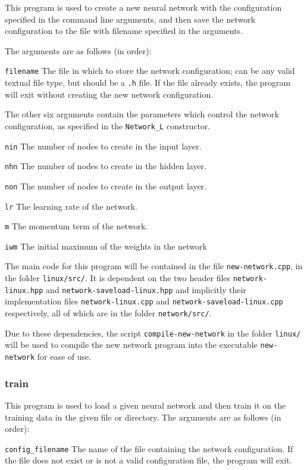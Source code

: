 \documentclass[a4paper]{article}
\begin{document}
This program is used to create a new neural network with the configuration specified in the command line arguments, and then save the network configuration to the file with filename specified in the arguments.

The arguments are as follows (in order):

\lstinline{filename} The file in which to store the network configuration; can be any valid textual file type, but should be a \lstinline{.h} file. If the file already exists, the program will exit without creating the new network configuration.

The other six arguments contain the parameters which control the network configuration, as specified in the \lstinline{Network_L} constructor.

\lstinline{nin} The number of nodes to create in the input layer.

\lstinline{nhn} The number of nodes to create in the hidden layer.

\lstinline{non} The number of nodes to create in the output layer.

\lstinline{lr} The learning rate of the network.

\lstinline{m} The momentum term of the network.

\lstinline{iwm} The initial maximum of the weights in the network

The main code for this program will be contained in the file \lstinline{new-network.cpp}, in the folder \lstinline{linux/src/}. It is dependent on the two header files \lstinline{network-linux.hpp} and \lstinline{network-saveload-linux.hpp} and implicitly their implementation files \lstinline{network-linux.cpp} and \lstinline{network-saveload-linux.cpp} respectively, all of which are in the folder \lstinline{network/src/}.

Due to these dependencies, the script \lstinline{compile-new-network} in the folder \lstinline{linux/} will be used to compile the new network program into the executable \lstinline{new-network} for ease of use.

\subsubsection{train}
\label{subsubsec:dc_csa_train}

This program is used to load a given neural network and then train it on the training data in the given file or directory. The arguments are as follows (in order):

\lstinline{config_filename} The name of the file containing the network configuration. If the file does not exist or is not a valid configuration file, the program will exit.
\end{document}
